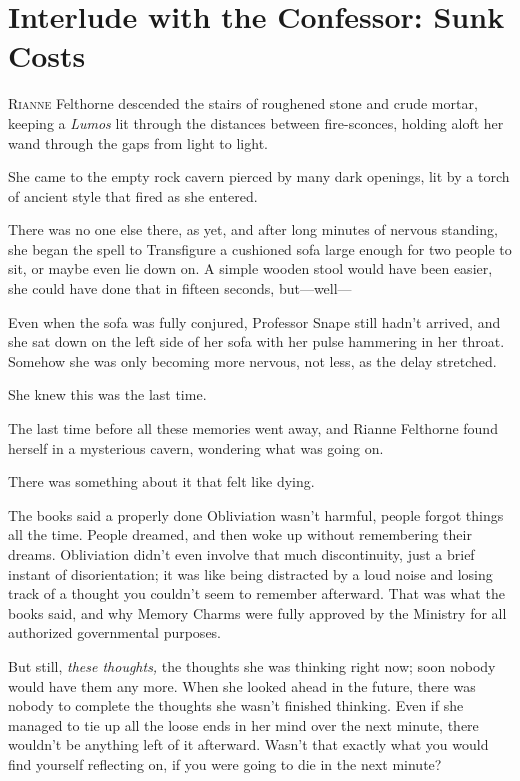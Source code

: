 \chapter{Interlude with the Confessor: Sunk Costs}


\lettrine{R}{ianne} Felthorne
descended the stairs of roughened stone and crude mortar, keeping a
\emph{Lumos} lit through the distances between fire-sconces, holding aloft her
wand through the gaps from light to light.

She came to the empty rock cavern pierced by many dark openings, lit by a torch
of ancient style that fired as she entered.

There was no one else there, as yet, and after long minutes of nervous
standing, she began the spell to Transfigure a cushioned sofa large enough for
two people to sit, or maybe even lie down on. A simple wooden stool would have
been easier, she could have done that in fifteen seconds, but---well---

Even when the sofa was fully conjured, Professor Snape still hadn't arrived,
and she sat down on the left side of her sofa with her pulse hammering in her
throat. Somehow she was only becoming more nervous, not less, as the delay
stretched.

She knew this was the last time.

The last time before all these memories went away, and Rianne Felthorne found
herself in a mysterious cavern, wondering what was going on.

There was something about it that felt like dying.

The books said a properly done Obliviation wasn't harmful, people forgot things
all the time. People dreamed, and then woke up without remembering their
dreams. Obliviation didn't even involve that much discontinuity, just a brief
instant of disorientation; it was like being distracted by a loud noise and
losing track of a thought you couldn't seem to remember afterward. That was
what the books said, and why Memory Charms were fully approved by the Ministry
for all authorized governmental purposes.

But still, \emph{these thoughts,} the thoughts she was thinking right now; soon
nobody would have them any more. When she looked ahead in the future, there was
nobody to complete the thoughts she wasn't finished thinking. Even if she
managed to tie up all the loose ends in her mind over the next minute, there
wouldn't be anything left of it afterward. Wasn't that exactly what you would
find yourself reflecting on, if you were going to die in the next minute?

